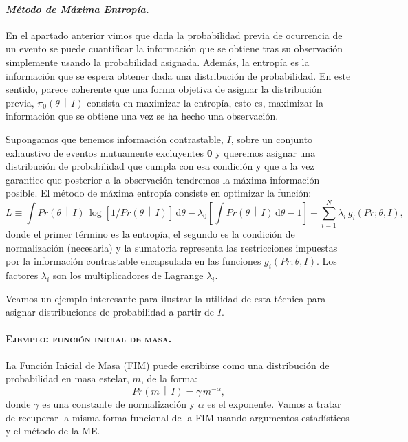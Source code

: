 \documentclass[a4paper,twoside]{article}
\newcommand{\hip}{\ensuremath{\mathbold{\theta}}\xspace}
\newcommand{\pri}[2]{\ensuremath{\pi_0\left(#1\,\middle|\, #2\right)}\xspace}
\newcommand{\pro}[2]{\ensuremath{Pr\left(#1\,\middle|\, #2\right)}\xspace}
\begin{document}
\paragraph{\textit{\color{teal}Método de Máxima Entropía.}} En el apartado anterior vimos que dada
la probabilidad previa de ocurrencia de un evento se puede cuantificar la información que se obtiene
tras su observación simplemente usando la probabilidad asignada. Además, la entropía es la
información que se espera obtener dada una distribución de probabilidad. En este sentido, parece
coherente que una forma objetiva de asignar la distribución previa, $\pri{\theta}{I}$ consista en
maximizar la entropía, esto es, maximizar la información que se obtiene una vez se ha hecho una
observación.

Supongamos que tenemos información contrastable, $I$, sobre un conjunto exhaustivo de eventos
mutuamente excluyentes $\hip$ y queremos asignar una distribución de probabilidad que cumpla con esa
condición y que a la vez garantice que posterior a la observación tendremos la máxima información
posible. El método de máxima entropía consiste en optimizar la función:
%
$$L\equiv\int\pro{\theta}{I}\,\log{\left[1/\pro{\theta}{I}\right]}\,\text{d}\theta - \lambda_0\left[\int\pro{\theta}{I}\,\text{d}\theta-1\right] - \sum_{i=1}^N \lambda_i\,g_i(Pr;\theta,I),$$
%
donde el primer término es la entropía, el segundo es la condición de normalización (necesaria) y la
sumatoria representa las restricciones impuestas por la información contrastable encapsulada en las
funciones $g_i(Pr;\theta,I)$. Los factores $\lambda_i$ son los multiplicadores de Lagrange
$\lambda_i$.

Veamos un ejemplo interesante para ilustrar la utilidad de esta técnica para asignar distribuciones
de probabilidad a partir de $I$.

\paragraph{\textsc{Ejemplo: función inicial de masa.}} La Función Inicial de Masa (FIM)
puede escribirse como una distribución de probabilidad en masa estelar, $m$, de la forma:
$$\pro{m}{I} = \gamma\,m^{-\alpha},$$
%
donde $\gamma$ es una constante de normalización y $\alpha$ es el exponente. Vamos a tratar de
recuperar la misma forma funcional de la FIM usando argumentos estadísticos y el método de la ME.
\end{document}

